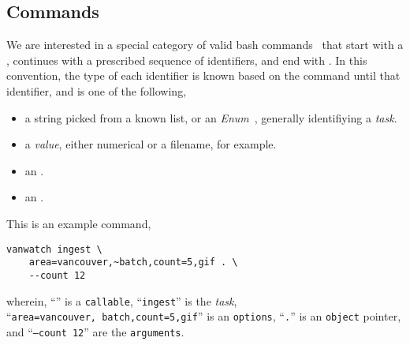 \subsection{Commands}\label{command}\label{commands}

We are interested in a special category of valid bash commands~\cite{shell_syntax} that start with a , continues with a prescribed sequence of identifiers, and end with \kArguments. In this convention, the type of each identifier is known based on the command until that identifier, and is one of the following,
%
\begin{itemize}
    \item a string picked from a known list, or an \emph{Enum}~\cite{python_eunum}, generally identifiying a \emph{task}.
    \item a \emph{value}, either numerical or a filename, for example.
    \item an .
    \item an .
\end{itemize}
%
This is an example command,
%
\begin{verbatim}
vanwatch ingest \
    area=vancouver,~batch,count=5,gif . \
    --count 12
\end{verbatim}
%
wherein, ``\cVanwatch'' is a \texttt{callable}, ``\texttt{ingest}'' is the \emph{task}, ``\texttt{area=vancouver,~batch,count=5,gif}'' is an \texttt{options}, ``\texttt{.}'' is an \texttt{object} pointer, and ``\texttt{--count 12}'' are the \texttt{arguments}.